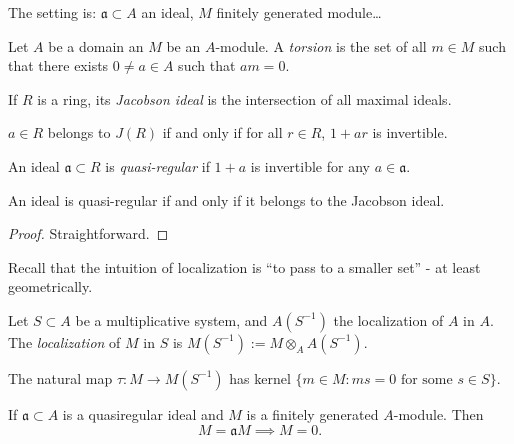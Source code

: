 The setting is:
$\mathfrak{a}\subset A$ an ideal,
$M$ finitely generated module…


\begin{definition}
\label{definition-torsion}
Let $A$ be a domain an
$M$ be an $A$-module.
A {\it torsion} is the set of all $m \in M$
such that there exists $0 \neq a \in A$
such that $a m=0$.
\end{definition}

\begin{definition}
\label{definition-jacobson-ideal}
If $R$ is a ring,
its {\it Jacobson ideal} is
the intersection of all maximal ideals.
\end{definition}

\begin{lemma}
\label{lemma-jacobson-ideal}
$a \in R$ belongs to $J(R)$
if and only if for all $r \in R$,
$1+ar$ is invertible.
\end{lemma}

\begin{definition}
\label{definition-quasi-regular-ideal}
An ideal $\mathfrak{a}\subset R$
is {\it quasi-regular} if $1+a$
is invertible for any $a \in \mathfrak{a}$.
\end{definition}

\begin{lemma}
\label{lemma-quasi-regular-jacobson}
An ideal is quasi-regular if and only if
it belongs to the Jacobson ideal.
\end{lemma}

\begin{proof}
Straightforward.
\end{proof}

\noindent
Recall that the intuition of localization
is ``to pass to a smaller set'' -
at least geometrically.

\begin{definition}
\label{definition-localization-module}
Let $S \subset A$ be a multiplicative
system,
and $A(S^{-1})$ the localization of $A$
in $A$.
The {\it localization} of $M$ in $S$
is $M(S^{-1}):= M \otimes_A A(S^{-1})$.
\end{definition}

\begin{lemma}
\label{lemma-kernel-localization}
The natural map $\tau:M\to M(S^{-1})$
has kernel
$\{m \in M:ms=0\text{ for some }
s \in S \}$.
\end{lemma}

\begin{lemma}
\label{lemma-nakayama-first}
If $\mathfrak{a}\subset A$ is a quasiregular
ideal and $M$ is a finitely generated
$A$-module. Then
$$
M=\mathfrak{a}M \implies M=0.
$$
\end{lemma}

